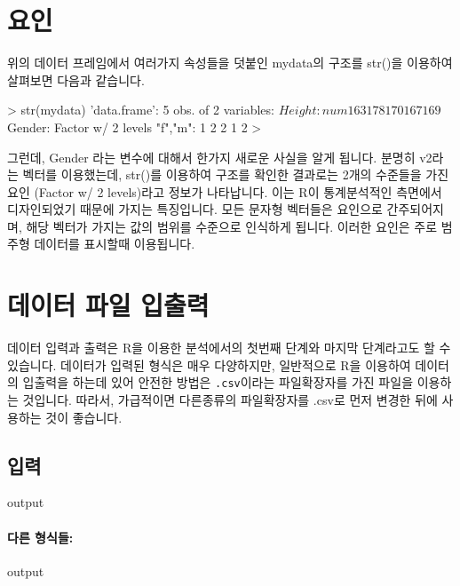 \documentclass{book}
\begin{document}
\section{요인}

위의 데이터 프레임에서 여러가지 속성들을 덧붙인 mydata의 구조를 str()을 이용하여 살펴보면 다음과 같습니다.

\begin{Schunk}
\begin{Soutput}
> str(mydata)
'data.frame':	5 obs. of  2 variables:
 $ Height: num  163 178 170 167 169
 $ Gender: Factor w/ 2 levels "f","m": 1 2 2 1 2
> 
\end{Soutput}
\end{Schunk}

그런데, Gender 라는 변수에 대해서 한가지 새로운 사실을 알게 됩니다. 
분명히 v2라는 벡터를 이용했는데, str()를 이용하여 구조를 확인한 결과로는 2개의 수준들을 가진 요인 (Factor w/ 2 levels)라고 정보가 나타납니다.
이는 R이 통계분석적인 측면에서 디자인되었기 때문에 가지는 특징입니다.
모든 문자형 벡터들은 요인으로 간주되어지며, 해당 벡터가 가지는 값의 범위를 수준으로 인식하게 됩니다.
이러한 요인은 주로 범주형 데이터를 표시할때 이용됩니다.



\section{데이터 파일 입출력}

데이터 입력과 출력은 R을 이용한 분석에서의 첫번째 단계와 마지막 단계라고도 할 수 있습니다. 
데이터가 입력된 형식은 매우 다양하지만,  일반적으로 R을 이용하여 데이터의 입출력을 하는데 있어 안전한 방법은 \texttt{.csv}이라는 파일확장자를 가진 파일을 이용하는 것입니다.
따라서, 가급적이면 다른종류의 파일확장자를 .csv로 먼저 변경한 뒤에 사용하는 것이 좋습니다. 

\subsection{입력}
\begin{Schunk}
\begin{Soutput}
output
\end{Soutput}
\end{Schunk}

\paragraph{다른 형식들: }
\begin{Schunk}
\begin{Soutput}
output
\end{Soutput}
\end{Schunk}
\end{document}
